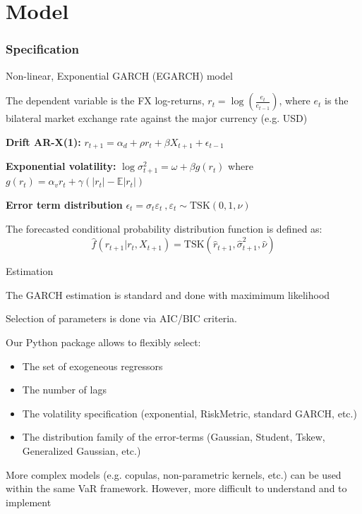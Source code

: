 \documentclass{beamer}
\newenvironment{wideitemize}{\itemize\addtolength{\itemsep}{10pt}}{\enditemize}
\begin{document}
\section{Model}

\begin{frame}
  \frametitle{Specification}
\begin{wideitemize}  
\item Non-linear, Exponential GARCH (EGARCH) model 
\item The dependent variable is the FX log-returns, $r_t = \log(\frac{e_t}{e_{t-1}})$, where
$e_t$ is the bilateral market exchange rate against the major currency
(e.g. USD)
\item \textbf{Drift AR-X(1):} $r_{t+1} = \alpha_d +
  \rho r_t + \beta X_{t+1} + \epsilon_{t-1}$\\  
\item \textbf{Exponential volatility:} $\log \sigma_{t+1}^{2} = \omega + \beta
g(r_t)$ where $g(r_t) = \alpha_v r_t + \gamma(|r_t|-\mathbb{E}|r_t|)$

\item \textbf{Error term distribution} $\epsilon_t = \sigma_t \varepsilon_t
  \ , \varepsilon_t \sim \text{TSK}(0, 1,\nu)$\\
  
\item The forecasted conditional probability distribution function is defined as:
      \begin{equation*}
        \hat{f}(r_{t+1} | r_{t}, X_{t+1}) = \text{TSK}(\hat{r}_{t+1},
        \hat{\sigma}_{t+1}^{2}, \hat{\nu})
      \end{equation*}      
\end{wideitemize}
\end{frame}

\begin{frame}{Estimation}
\begin{wideitemize}
\item The GARCH estimation is standard and done with maximimum likelihood
 \item Selection of parameters is done via AIC/BIC criteria.    
  \item Our Python package allows to flexibly select:
    \begin{itemize}
    \item The set of exogeneous regressors
    \item The number of lags
    \item The volatility specification (exponential, RiskMetric, standard GARCH,
      etc.)
    \item The distribution family of the error-terms (Gaussian,
    Student, Tskew, Generalized Gaussian, etc.)  
  \end{itemize}
\item More complex models (e.g. copulas, non-parametric kernels, etc.) can be
  used within the same VaR framework. However, more difficult to understand
  and to implement
\end{wideitemize}
\end{frame}
\end{document}
